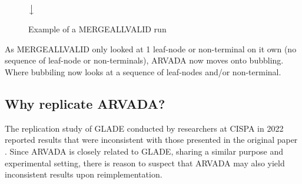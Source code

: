 \begin{figure}[h!]
\centering
{}

$\big\downarrow$


\caption{Example of a MERGEALLVALID run}
\label{fig:mergallvalid}
\end{figure}

As MERGEALLVALID only looked at 1 leaf-node or non-terminal on it own (no sequence of leaf-node or non-terminals), ARVADA now moves onto bubbling. Where bubbiling now looks at a sequence of leaf-nodes and/or non-terminal.

\subsection{Why replicate ARVADA?}
The replication study of GLADE \cite{bastaniSynthesizingProgramInput} conducted by researchers at CISPA \cite{bendrissouSynthesizingInputGrammars2022} in 2022 reported results that were inconsistent with those presented in the original paper \cite{bastaniSynthesizingProgramInput}. Since ARVADA is closely related to GLADE, sharing a similar purpose and experimental setting, there is reason to suspect that ARVADA may also yield inconsistent results upon reimplementation.

